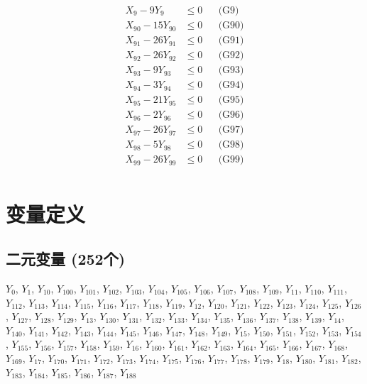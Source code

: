 \documentclass[a4paper,10pt]{article}
\begin{document}
{\begin{align}
X_{9} - 9Y_{9} &\leq 0 && \text{(G9)} \\
X_{90} - 15Y_{90} &\leq 0 && \text{(G90)} \\
X_{91} - 26Y_{91} &\leq 0 && \text{(G91)} \\
X_{92} - 26Y_{92} &\leq 0 && \text{(G92)} \\
X_{93} - 9Y_{93} &\leq 0 && \text{(G93)} \\
X_{94} - 3Y_{94} &\leq 0 && \text{(G94)} \\
X_{95} - 21Y_{95} &\leq 0 && \text{(G95)} \\
X_{96} - 2Y_{96} &\leq 0 && \text{(G96)} \\
X_{97} - 26Y_{97} &\leq 0 && \text{(G97)} \\
X_{98} - 5Y_{98} &\leq 0 && \text{(G98)} \\
X_{99} - 26Y_{99} &\leq 0 && \text{(G99)} \\
\end{align}}

\section{变量定义}

\subsection{二元变量 (252个)}

{\small $Y_{0}$, $Y_{1}$, $Y_{10}$, $Y_{100}$, $Y_{101}$, $Y_{102}$, $Y_{103}$, $Y_{104}$, $Y_{105}$, $Y_{106}$, $Y_{107}$, $Y_{108}$, $Y_{109}$, $Y_{11}$, $Y_{110}$, $Y_{111}$, $Y_{112}$, $Y_{113}$, $Y_{114}$, $Y_{115}$, $Y_{116}$, $Y_{117}$, $Y_{118}$, $Y_{119}$, $Y_{12}$, $Y_{120}$, $Y_{121}$, $Y_{122}$, $Y_{123}$, $Y_{124}$, $Y_{125}$, $Y_{126}$, $Y_{127}$, $Y_{128}$, $Y_{129}$, $Y_{13}$, $Y_{130}$, $Y_{131}$, $Y_{132}$, $Y_{133}$, $Y_{134}$, $Y_{135}$, $Y_{136}$, $Y_{137}$, $Y_{138}$, $Y_{139}$, $Y_{14}$, $Y_{140}$, $Y_{141}$, $Y_{142}$, $Y_{143}$, $Y_{144}$, $Y_{145}$, $Y_{146}$, $Y_{147}$, $Y_{148}$, $Y_{149}$, $Y_{15}$, $Y_{150}$, $Y_{151}$, $Y_{152}$, $Y_{153}$, $Y_{154}$, $Y_{155}$, $Y_{156}$, $Y_{157}$, $Y_{158}$, $Y_{159}$, $Y_{16}$, $Y_{160}$, $Y_{161}$, $Y_{162}$, $Y_{163}$, $Y_{164}$, $Y_{165}$, $Y_{166}$, $Y_{167}$, $Y_{168}$, $Y_{169}$, $Y_{17}$, $Y_{170}$, $Y_{171}$, $Y_{172}$, $Y_{173}$, $Y_{174}$, $Y_{175}$, $Y_{176}$, $Y_{177}$, $Y_{178}$, $Y_{179}$, $Y_{18}$, $Y_{180}$, $Y_{181}$, $Y_{182}$, $Y_{183}$, $Y_{184}$, $Y_{185}$, $Y_{186}$, $Y_{187}$, $Y_{188}$}
\end{document}
